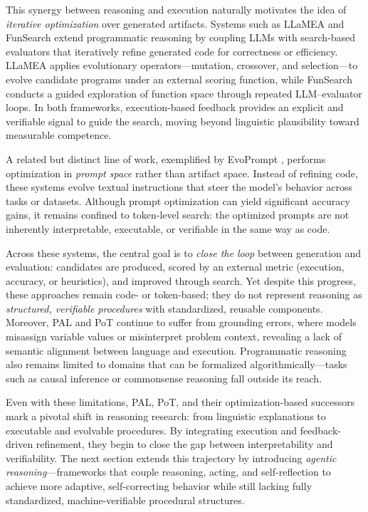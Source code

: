 \documentclass[project]{bsu-cs}  %
\begin{document}
This synergy between reasoning and execution naturally motivates the idea of \emph{iterative optimization} over generated artifacts. Systems such as LLaMEA \citep{vanstein2025llamealargelanguagemodel} and FunSearch \citep{funsearch} extend programmatic reasoning by coupling LLMs with search-based evaluators that iteratively refine generated code for correctness or efficiency. LLaMEA applies evolutionary operators—mutation, crossover, and selection—to evolve candidate programs under an external scoring function, while FunSearch conducts a guided exploration of function space through repeated LLM–evaluator loops. In both frameworks, execution-based feedback provides an explicit and verifiable signal to guide the search, moving beyond linguistic plausibility toward measurable competence.

A related but distinct line of work, exemplified by EvoPrompt \citep{guo2025evopromptconnectingllmsevolutionary}, performs optimization in \emph{prompt space} rather than artifact space. Instead of refining code, these systems evolve textual instructions that steer the model’s behavior across tasks or datasets. Although prompt optimization can yield significant accuracy gains, it remains confined to token-level search: the optimized prompts are not inherently interpretable, executable, or verifiable in the same way as code.

Across these systems, the central goal is to \emph{close the loop} between generation and evaluation: candidates are produced, scored by an external metric (execution, accuracy, or heuristics), and improved through search. Yet despite this progress, these approaches remain code- or token-based; they do not represent reasoning as \emph{structured, verifiable procedures} with standardized, reusable components. Moreover, PAL and PoT continue to suffer from grounding errors, where models misassign variable values or misinterpret problem context, revealing a lack of semantic alignment between language and execution. Programmatic reasoning also remains limited to domains that can be formalized algorithmically—tasks such as causal inference or commonsense reasoning fall outside its reach.

Even with these limitations, PAL, PoT, and their optimization-based successors mark a pivotal shift in reasoning research: from linguistic explanations to executable and evolvable procedures. By integrating execution and feedback-driven refinement, they begin to close the gap between interpretability and verifiability. The next section extends this trajectory by introducing \emph{agentic reasoning}—frameworks that couple reasoning, acting, and self-reflection to achieve more adaptive, self-correcting behavior while still lacking fully standardized, machine-verifiable procedural structures.
% 
%
%
% 
\end{document}
